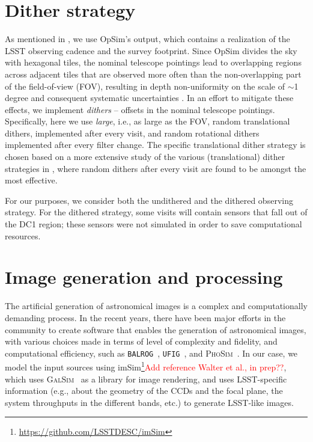 \documentclass[twocolumn]{aastex62}
\begin{document}
\section{Dither strategy}
\label{sec:dithering}

As mentioned in , we use OpSim's output, which contains a realization of the LSST observing cadence and the survey footprint. Since OpSim divides the sky with hexagonal tiles, the nominal telescope pointings lead to overlapping regions across adjacent tiles that are observed more often than the non-overlapping part of the field-of-view (FOV), resulting in depth non-uniformity on the scale of $\sim$1 degree and consequent systematic uncertainties \citep{2016ApJ...829...50A}. In an effort to mitigate these effects, we implement \textit{dithers} -- offsets in the nominal telescope pointings. Specifically, here we use \textit{large}, i.e., as large as the FOV, random translational dithers, implemented after every visit, and random rotational dithers implemented after every filter change. The specific translational dither strategy is chosen based on a more extensive study of the various (translational) dither strategies in \citet{2016ApJ...829...50A}, where random dithers after every visit are found to be amongst the most effective.

For our purposes, we consider both the undithered and the dithered observing strategy. For the dithered strategy, some visits will contain sensors that fall out of the DC1 region; these sensors were not simulated in order to save computational resources.

\section{Image generation and processing}
\label{sec:image_generation_pipeline}

The artificial generation of astronomical images is a complex and computationally demanding process. In the recent
years, there have been major efforts in the community to create software that enables the generation of astronomical images, with various choices made in terms of level of complexity and fidelity, and computational efficiency, such as \texttt{BALROG}~\citep{2016MNRAS.457..786S}, \texttt{UFIG}~\citep{2016ApJ...817...25B}, and \textsc{PhoSim}~\citep{2015ApJS..218...14P}. In our case, we model the input sources using imSim\footnote{\url{https://github.com/LSSTDESC/imSim}}\textcolor{red}{Add reference Walter et al., in prep??}, which uses \textsc{GalSim}~\citep{2015A&C....10..121R} as a library for image rendering, and uses LSST-specific information (e.g., about the geometry of the CCDs and the focal plane, the system throughputs in the different bands, etc.) to generate LSST-like images.
\end{document}
